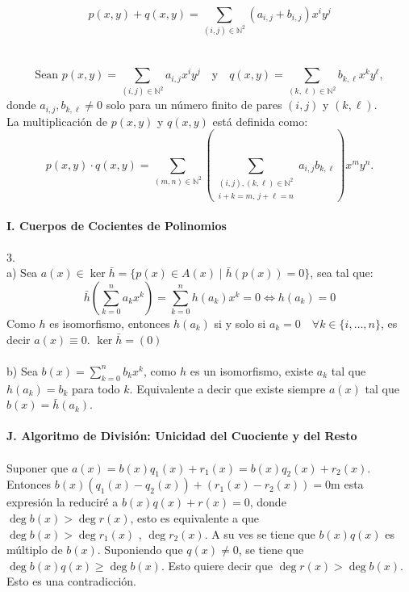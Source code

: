 \documentclass{article}
\begin{document}
\begin{equation*}
    p(x,y)+q(x,y)=\sum_{(i,j)\in \mathbb{N}^{2}}(a_{i,j}+b_{i,j})x^{i}y^{j}
\end{equation*}
\\
\\
\[
\text{Sean } p(x, y) = \sum_{(i, j) \in \mathbb{N}^2} a_{i,j} x^i y^j 
\quad \text{y} \quad 
q(x, y) = \sum_{(k, \ell) \in \mathbb{N}^2} b_{k,\ell} x^k y^\ell,
\]
donde \( a_{i,j}, b_{k,\ell} \neq 0 \) solo para un número finito de pares \((i, j)\) y \((k, \ell)\).
\\
La multiplicación de \( p(x, y) \) y \( q(x, y) \) está definida como:
\[
p(x, y) \cdot q(x, y) = \sum_{(m, n) \in \mathbb{N}^2} \left( \sum_{\substack{(i, j), (k, \ell) \in \mathbb{N}^2 \\ i + k = m, \, j + \ell = n}} a_{i,j} b_{k,\ell} \right) x^m y^n.
\]
\\
\textbf{I. 
Cuerpos de Cocientes de Polinomios}
\\
\\
3. 
\\
a) Sea $a(x) \in \ker \bar{h} = \{p(x) \in A(x) \mid \bar{h}(p(x))=0 \}$, sea tal que:
\begin{equation*}
    \bar{h} \left(\sum_{k=0}^{n}a_{k}x^{k} \right) = \sum_{k=0}^{n} h(a_{k})x^{k} = 0 \Longleftrightarrow h(a_{k})=0
\end{equation*}
Como $h$ es isomorfismo, entonces $h(a_{k})$ si y solo si $a_{k}=0 \quad \forall k \in \{i,\dots,n\}$, es decir $a(x) \equiv 0$. $\ker \bar{h}=(0)$
\\
\\
b) Sea $b(x)=\sum_{k=0}^{n}b_{k}x^{k}$, como $h$ es un isomorfismo, existe $a_{k}$ tal que $h(a_{k})=b_{k}$ para todo $k$. Equivalente a decir que existe siempre $a(x)$ tal que $b(x)=\bar{h}(a_{k})$.
\\
\\
\textbf{J. Algoritmo de División: Unicidad del Cuociente y del Resto}
\\
\\
Suponer que $a(x)=b(x)q_{1}(x)+r_{1}(x)=b(x)q_{2}(x)+r_{2}(x)$. Entonces $b(x)(q_{1}(x)-q_{2}(x))+(r_{1}(x)-r_{2}(x))=0$m esta expresión la reduciré a $b(x)q(x)+r(x)=0$, donde $\deg b(x) > \deg r(x)$, esto es equivalente a que $\deg b(x) > \deg r_{1}(x)\text{ , } \deg r_{2}(x)$. A su ves se tiene que $b(x)q(x)$ es múltiplo de $b(x)$. Suponiendo que $q(x) \neq 0$, se tiene que $\deg b(x)q(x) \geq \deg b(x)$. Esto quiere decir que $\deg r(x) > \deg b(x)$. Esto es una contradicción.
\end{document}
